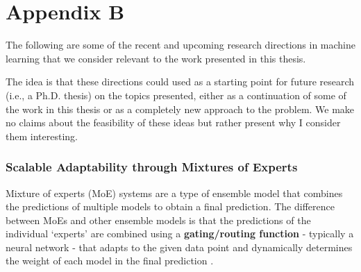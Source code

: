 \documentclass[../main.tex]{subfiles}
\begin{document}
\chapter*{Appendix B} \label{appendix:further_research}

The following are some of the recent and upcoming research directions in machine learning that we consider relevant to the work presented in this thesis.
    
The idea is that these directions could used as a starting point for future research (i.e., a Ph.D. thesis) on the topics presented, either as a continuation of some of the work in this thesis or as a completely new approach to the problem. We make no claims about the feasibility of these ideas but rather present why I consider them interesting.

    

    


    \subsection{Scalable Adaptability through Mixtures of Experts} \label{conclusions:research_directions:moes} 

    Mixture of experts (MoE) systems are a type of ensemble model that combines the predictions of multiple models to obtain a final prediction. The difference between MoEs and other ensemble models is that the predictions of the individual `experts' are combined using a \textbf{gating/routing function} - typically a neural network - that adapts to the given data point and dynamically determines the weight of each model in the final prediction \cite{chen_towards_2022}.
\end{document}
